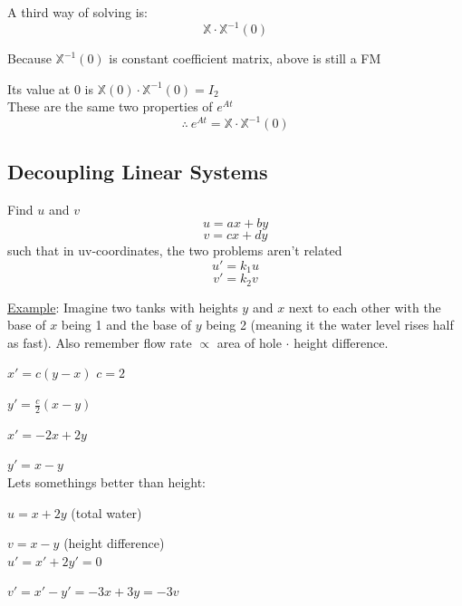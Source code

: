 \documentclass[12pt]{article}
\numberwithin{equation}{subsection}
\newcommand{\inda}{\hspace{.5cm}}
\newcommand{\indb}{\hspace{1cm}}
\newcommand{\inde}{\hspace{2.5cm}}
\newcommand{\indi}{\hspace{4.5cm}}
\newcommand{\indu}{\hspace{10.5cm}}
\newcommand{\exa}{\noindent \underline{Example}: \hspace{1cm}}
\begin{document}
A third way of solving is:
\begin{equation}
\mathbb{X} \cdot \mathbb{X}^{-1}(0)
\end{equation}

\indb Because $\mathbb{X}^{-1}(0)$ is constant coefficient matrix, above is still a FM

\indb Its value at 0 is $\mathbb{X}(0) \cdot \mathbb{X}^{-1}(0) = I_2$\\

These are the same two properties of $e^{At}$
\begin{equation}
\therefore\ e^{At}=\mathbb{X} \cdot \mathbb{X}^{-1}(0)
\end{equation}

\newpage
\subsection{Decoupling Linear Systems}

Find $u$ and $v$
\begin{equation}
u=ax+by
\end{equation}
\begin{equation}
v=cx+dy
\end{equation}
such that in uv-coordinates, the two problems aren't related
\begin{equation}
u'=k_1u
\end{equation}
\begin{equation}
v'=k_2v
\end{equation}


\exa Imagine two tanks with heights $y$ and $x$ next to each other with the base of $x$ being 1 and the base of $y$ being 2 (meaning it the water level rises half as fast). Also remember flow rate $\propto$ area of hole $\cdot$ height difference. 

\indu $x'=c(y-x)$ \indb $c=2$

\indu $y'=\frac{c}{2}(x-y)$

\indi $x'=-2x+2y$

\indi $y'=x-y$\\

Lets somethings better than height:

\indb $u=x+2y$ \inda (total water)

\indb $v=x-y$ \inda (height difference)\\

\inde $u'=x'+2y'=0$

\inde $v'=x'-y'=-3x+3y=-3v$\\
\end{document}
